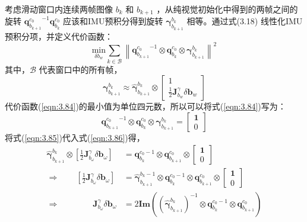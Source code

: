 考虑滑动窗口内连续两帧图像 $ b_k $ 和 $b_{k+1}$ ，从纯视觉初始化中得到的两帧之间的旋转 $ {\mathbf{q}_{b_{k+1}}^{c_0}}^{-1} \mathbf{q}_{b_k}^{c_0} $  应该和IMU预积分得到旋转 $ \bm{\gamma}_{b_{k+1}}^{b_k} $ 相等。通过式(3.18) 线性化IMU预积分项，并定义代价函数：
\begin{equation}
\label{eqn:3.84}
\underset{\delta b_w}{\text{min}}\sum_{k\in \mathcal{B} }\left\|{\mathbf{q}_{b_{k+1}}^{c_0}}^{-1}\otimes\mathbf{q}_{b_k}^{c_0}\otimes\bm{\gamma}_{b_{k+1}}^{b_k}\right\|^2 
\end{equation}
其中，$\mathcal{B} $ 代表窗口中的所有帧，
\begin{equation}
\label{eqn:3.85}
\bm{\gamma}_{b_{k+1}}^{b_k}\approx\hat{\bm{\gamma}}_{b_{k+1}}^{b_k}\otimes\begin{bmatrix}
1 \\ \frac{1}{2}\mathbf{J}_{b_w}^\gamma\delta\mathbf{b}_w
\end{bmatrix}
\end{equation}
代价函数(\ref{eqn:3.84})的最小值为单位四元数，所以可以将式(\ref{eqn:3.84})写为：
\begin{equation}
\label{eqn:3.86}
{ \mathbf{ q}_{b_{k+1}}^{c_{0}}}^{-1} \otimes \mathbf{q}_{b_{k}}^{c_{0}} \otimes \bm{\gamma}_{b_{k+1}}^{b_{k}}=\left[ \begin{array}{l}{\mathbf{1}} \\ {0}\end{array}\right]
\end{equation}
将式(\ref{eqn:3.85})代入式(\ref{eqn:3.86})得，
\begin{equation}
\label{eqn:3.87}
\begin{aligned}
\hat{\bm{\gamma}}_{b_{k+1}}^{b_{k}} \otimes\left[\frac{1}{2} \mathbf{J}_{b_{\omega}}^{\gamma} \delta \mathbf{b}_{\omega}\right]
&= \mathbf{q}_{b_{k}}^{c_{0}-1} \otimes \mathbf{q}_{b_{k+1}}^{c_{0}} \otimes \left[ \begin{array}{l}{\mathbf{1}} \\ {0}\end{array}\right] \\
\Longrightarrow \quad \quad \left[\frac{1}{2} \mathbf{J}_{b_{\omega}}^{\gamma} \delta \mathbf{b}_{\omega}\right]
&= \hat{\bm{\gamma}}_{b_{k+1}}^{b_{k}-1} \otimes \mathbf{q}_{b_{k}}^{c_{0}-1} \otimes \mathbf{q}_{b_{k+1}}^{c_{0}} \otimes \left[ \begin{array}{l}{\mathbf{1}} \\ {0}\end{array}\right] \\
\Longrightarrow \quad \quad \quad \quad  \mathbf{J}_{b_{\omega}}^{\gamma} \delta \mathbf{ b}_{\omega} 
&=2 \mathbf{Im}\left( (\hat{\bm{\gamma}}^{b_{k}}_{b_{k+1}})^{-1} \otimes \mathbf{q}_{b_{k}}^{c_{0}-1} \otimes \mathbf{q}_{b_{k+1}}^{c_{0}}\right)
\end{aligned}
\end{equation}
